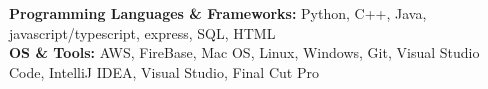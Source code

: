 

\begin{cvparagraph}

\textbf{Programming Languages \& Frameworks:}  Python, C++, Java,  javascript/typescript, express,  SQL,  HTML
\\[2pt]
\textbf{OS \& Tools:} AWS,  FireBase, Mac OS, Linux, Windows, Git, Visual Studio Code, IntelliJ IDEA, Visual Studio, Final Cut Pro


\end{cvparagraph}

